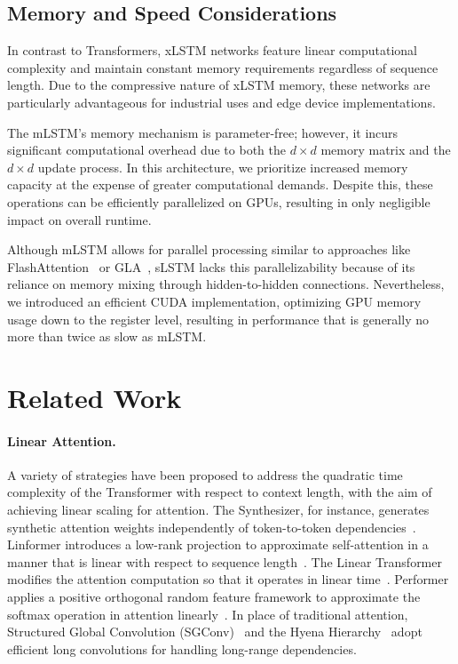 \subsection{Memory and Speed Considerations}

In contrast to Transformers, xLSTM networks feature linear computational complexity and maintain constant memory requirements regardless of sequence length. Due to the compressive nature of xLSTM memory, these networks are particularly advantageous for industrial uses and edge device implementations.

The mLSTM’s memory mechanism is parameter-free; however, it incurs significant computational overhead due to both the $d \times d$ memory matrix and the $d \times d$ update process. In this architecture, we prioritize increased memory capacity at the expense of greater computational demands. Despite this, these operations can be efficiently parallelized on GPUs, resulting in only negligible impact on overall runtime.

Although mLSTM allows for parallel processing similar to approaches like FlashAttention~\citep{Dao:22,Dao:23} or GLA~\citep{Yang:23arxiv}, sLSTM lacks this parallelizability because of its reliance on memory mixing through hidden-to-hidden connections. Nevertheless, we introduced an efficient CUDA implementation, optimizing GPU memory usage down to the register level, resulting in performance that is generally no more than twice as slow as mLSTM.

\section{Related Work}
\label{sec:related}

\paragraph{Linear Attention.} A variety of strategies have been proposed to address the quadratic time complexity of the Transformer with respect to context length, with the aim of achieving linear scaling for attention. The Synthesizer, for instance, generates synthetic attention weights independently of token-to-token dependencies~\citep{Tay:20arxiv}. Linformer introduces a low-rank projection to approximate self-attention in a manner that is linear with respect to sequence length~\citep{Wang:20arxiv}. The Linear Transformer modifies the attention computation so that it operates in linear time~\citep{Katharopoulos:20}. Performer applies a positive orthogonal random feature framework to approximate the softmax operation in attention linearly~\citep{Choromanski:21}. In place of traditional attention, Structured Global Convolution (SGConv)~\citep{Li:22} and the Hyena Hierarchy~\citep{Poli:23} adopt efficient long convolutions for handling long-range dependencies.


